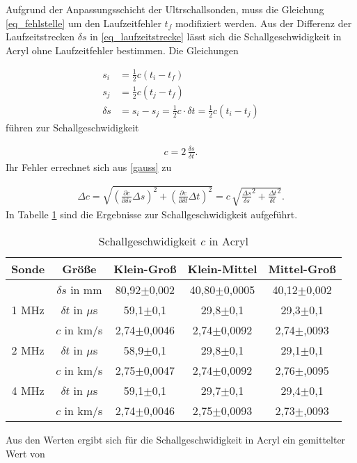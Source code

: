 Aufgrund der Anpassungsschicht der Ultrschallsonden, muss die Gleichung \eqref{eq_fehlstelle} um den Laufzeitfehler $t_f$ modifiziert werden.
Aus der Differenz der Laufzeitstrecken $\delta s$ in \eqref{eq_laufzeitstrecke} lässt sich die Schallgeschwidigkeit in Acryl ohne 
Laufzeitfehler bestimmen. Die Gleichungen

\begin{align}
\label{eq_laufzeitfehler}
 s_i &= \frac12 c (t_i - t_f)\\
 \nonumber
 s_j &= \frac12 c (t_j - t_f)\\
 \delta s &= s_i - s_j = \frac12 c \cdot  \delta t = \frac12 c (t_i - t_j)
 \label{eq_laufzeitstrecke}
\end{align}
führen zur Schallgeschwidigkeit

\begin{align}
 c = 2\, \frac{\delta s}{\delta t}.
\end{align}
Ihr Fehler errechnet sich aus \eqref{gauss} zu

\begin{align}
 \Delta c = \sqrt{\left(\frac{\partial c}{\partial \delta s} \Delta s \right)^2 + \left(\frac{\partial c}{\partial \delta t} \Delta t \right)^2} = c\, \sqrt{\frac{\Delta s}{\delta s}^2 + \frac{\Delta t}{\delta t}^2}.
\end{align}
In Tabelle \ref{tab_schall} sind die Ergebnisse zur Schallgeschwidigkeit aufgeführt. 
\renewcommand{\arraystretch}{1.5}
\begin{table}[H]
 \begin{tabular}{c|c|c|c|c}
Sonde & Größe & Klein-Groß & Klein-Mittel & Mittel-Groß\\
\hline
&$\delta s$ in mm	&	80,92$\pm$0,002&	40,80$\pm$0,0005&	40,12$\pm$0,002\\
\hline
\hline
1 MHz &$\delta t$ in $\mu$s &59,1$\pm$0,1&	29,8$\pm$0,1&	29,3$\pm$0,1\\
&$c$ in km/s		&2,74$\pm$0,0046&	2,74$\pm$0,0092	&	2,74$\pm$,0093\\
\hline
2 MHz &$\delta t$ in $\mu$s &	58,9$\pm$0,1&	29,8$\pm$0,1&	29,1$\pm$0,1\\
&$c$ in km/s		&2,75$\pm$0,0047&	2,74$\pm$0,0092	&	2,76$\pm$,0095\\
\hline
4 MHz &$\delta t$ in $\mu$s &	59,1$\pm$0,1&	29,7$\pm$0,1&	29,4$\pm$0,1\\
&$c$ in km/s		&2,74$\pm$0,0046&	2,75$\pm$0,0093&	2,73$\pm$,0093\\
 \end{tabular}
\caption{Schallgeschwidigkeit $c$ in Acryl}
\label{tab_schall}
\end{table}
\renewcommand{\arraystretch}{1.0}
Aus den Werten ergibt sich für die Schallgeschwidigkeit in Acryl ein gemittelter Wert von

